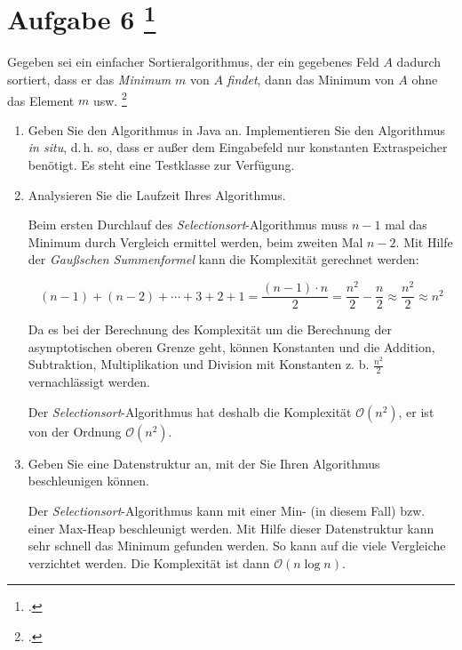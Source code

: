 \documentclass{lehramt-informatik-aufgabe}
\begin{document}

\section{Aufgabe 6
\footcite[Aufgabe 4, Seite 4]{aud:ab:3}}

Gegeben sei ein einfacher Sortieralgorithmus, der ein gegebenes Feld $A$
dadurch sortiert, dass er das \emph{Minimum} $m$ von $A$ \emph{findet},
dann das Minimum von $A$ ohne das Element $m$ usw.
\footcite[Thema 2 Aufgabe 6 Seite 5]{examen:66115:2014:09}

\begin{enumerate}


\item Geben Sie den Algorithmus in Java an.
Implementieren Sie den Algorithmus
\emph{in situ}, d.\,h. so, dass er außer dem Eingabefeld nur konstanten
Extraspeicher benötigt. Es steht eine Testklasse zur Verfügung.

\begin{antwort}
\end{antwort}


\item Analysieren Sie die Laufzeit Ihres Algorithmus.

\begin{antwort}
Beim ersten Durchlauf des \emph{Selectionsort}-Algorithmus muss $n - 1$
mal das Minimum durch Vergleich ermittel werden, beim zweiten Mal
$n - 2$.
Mit Hilfe der \emph{Gaußschen Summenformel} kann die Komplexität
gerechnet werden:

\begin{displaymath}
(n-1)+(n-2)+\dotsb+3+2+1 =
\frac{(n-1)\cdot n}{2} =
\frac{n^2}{2}-\frac{n}{2} \approx
\frac{n^2}{2} \approx
n^2
\end{displaymath}

Da es bei der Berechnung des Komplexität um die Berechnung der
asymptotischen oberen Grenze geht, können Konstanten und die Addition,
Subtraktion, Multiplikation und Division mit Konstanten z. b.
$\frac{n^2}{2}$ vernachlässigt werden.

Der \emph{Selectionsort}-Algorithmus hat deshalb die Komplexität
$\mathcal{O}(n^2)$, er ist von der Ordnung
$\mathcal{O}(n^2)$.
\end{antwort}


\item Geben Sie eine Datenstruktur an, mit der Sie Ihren Algorithmus
beschleunigen können.

\begin{antwort}
Der \emph{Selectionsort}-Algorithmus kann mit einer Min- (in diesem
Fall) bzw. einer Max-Heap beschleunigt werden. Mit Hilfe dieser
Datenstruktur kann sehr schnell das Minimum gefunden werden. So kann auf
die viele Vergleiche verzichtet werden. Die Komplexität ist dann
$\mathcal{O}(n \log n)$.
\end{antwort}
\end{enumerate}
\end{document}
